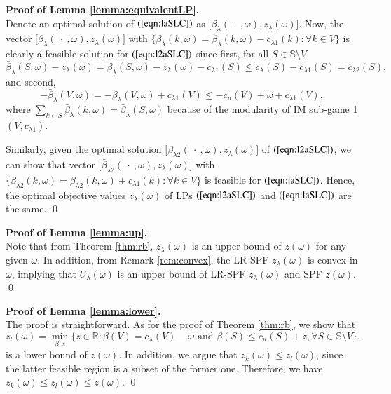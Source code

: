 \documentclass[authoryear,review,12pt]{elsarticle}
\newcommand{\R}{\mathbb{R}}
\begin{document}
\noindent \textbf{Proof of Lemma \ref{lemma:equivalentLP}.}\\
Denote an optimal solution of $(\ref{eqn:laSLC})$ as $\big[ \beta_{\lambda}(\ \cdot \ ,\omega), z_{\lambda}(\omega) \big]$. Now, the vector $\big[ \bar{\beta}_{\lambda}(\ \cdot \ ,\omega), z_{\lambda}(\omega) \big]$ with $\big\{\bar{\beta}_{\lambda}(k,\omega) = \beta_{\lambda}(k,\omega) - c_{\lambda1}(k):\forall k \in V\big\}$ is clearly a feasible solution for $(\ref{eqn:l2aSLC})$ since first, for all $S \in \mathbb{S} \setminus V$,
\begin{equation*}
\bar{\beta}_{\lambda}(S,\omega) - z_{\lambda}(\omega) = \beta_{\lambda}(S,\omega) - z_{\lambda}(\omega) - c_{\lambda1}(S) \leq c_{\lambda}(S) - c_{\lambda1}(S) = c_{\lambda2}(S),
\end{equation*}
and second,
\begin{equation*}
-\bar{\beta}_{\lambda}(V,\omega) = -\beta_{\lambda}(V,\omega) + c_{\lambda1}(V) \leq -c_{u}(V) + \omega + c_{\lambda1}(V),
\end{equation*}
where $\sum_{k \in S}\bar{\beta}_{\lambda}(k,\omega) = \bar{\beta}_{\lambda}(S,\omega)$ because of the modularity of IM sub-game 1  $(V,c_{\lambda1})$.

Similarly, given the optimal solution $\big[ \beta_{\lambda2}(\ \cdot \ ,\omega), z_{\lambda}(\omega) \big]$ of $(\ref{eqn:l2aSLC})$, we can show that vector $\big[ \bar{\beta}_{\lambda2}(\ \cdot \ ,\omega), z_{\lambda}(\omega) \big]$ with $\big\{\bar{\beta}_{\lambda2}(k,\omega) = \beta_{\lambda2}(k,\omega) + c_{\lambda1}(k):\forall k \in V\big\}$ is feasible for $(\ref{eqn:laSLC})$. Hence, the optimal objective values $z_{\lambda}(\omega)$ of LPs $(\ref{eqn:l2aSLC})$ and $(\ref{eqn:laSLC})$ are the same.
\qed


\noindent \textbf{Proof of Lemma \ref{lemma:up}.}\\
Note that from Theorem \ref{thm:rb}, $z_{\lambda}(\omega)$ is an upper bound of $z(\omega)$ for any given $\omega$.
In addition, from Remark \ref{rem:convex}, the LR-SPF $z_{\lambda}(\omega)$ is convex in $\omega$, implying that $U_{\lambda}(\omega)$ is an upper bound of LR-SPF $z_{\lambda}(\omega)$ and SPF $z(\omega)$.
\qed



\noindent \textbf{Proof of Lemma \ref{lemma:lower}.}\\
The proof is straightforward.
As for the proof of Theorem \ref{thm:rb}, we show that
$$z_{l}(\omega) = \min_{\beta,z} \big\{ z \in \R:\beta(V)=c_\lambda(V)-\omega \mbox{ and } \beta(S) \leq c_u(S)+z, \forall S \in \mathbb{S} \setminus V \big\},$$
is a lower bound of $z(\omega)$.
In addition, we argue that $z_k(\omega) \leq z_{l}(\omega)$, since the latter feasible region is a subset of the former one.
Therefore, we have $z_k(\omega)\leq z_{l}(\omega) \leq z(\omega)$.
\qed
\end{document}
